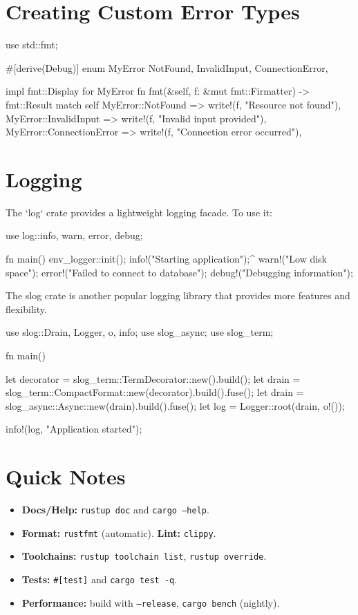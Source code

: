 \documentclass[8pt,a4paper,twocolumn]{extarticle}
\begin{document}
\section{Creating Custom Error Types}

\begin{Code}
use std::fmt;

#[derive(Debug)]
enum MyError {
  NotFound,
  InvalidInput,
  ConnectionError,
}

impl fmt::Display for MyError {
  fn fmt(&self, f: &mut fmt::Firmatter) -> fmt::Result {
    match self {
      MyError::NotFound => write!(f, "Resource not found"),
      MyError::InvalidInput => write!(f, "Invalid input provided"),
      MyError::ConnectionError => write!(f, "Connection error occurred"),
    }
  }
}
\end{Code}


\section{Logging}

The `log` crate provides a lightweight logging facade. To use it:

\begin{Code}
use log::{info, warn, error, debug};

fn main() {
    env_logger::init();
    info!("Starting application");^
    warn!("Low disk space");
    error!("Failed to connect to database");
    debug!("Debugging information");
}
\end{Code}

The slog crate is another popular logging library that provides more features and flexibility.

\begin{Code}
use slog::{Drain, Logger, o, info};
use slog_async;
use slog_term;

fn main() {
    let decorator = slog_term::TermDecorator::new().build();
    let drain = slog_term::CompactFormat::new(decorator).build().fuse();
    let drain = slog_async::Async::new(drain).build().fuse();
    let log = Logger::root(drain, o!());

    info!(log, "Application started");
}
\end{Code}

\section{Quick Notes}
\begin{itemize}
  \item \textbf{Docs/Help:} \texttt{rustup doc} and \texttt{cargo --help}.
  \item \textbf{Format:} \texttt{rustfmt} (automatic). \textbf{Lint:} \texttt{clippy}.
  \item \textbf{Toolchains:} \texttt{rustup toolchain list}, \texttt{rustup override}.
  \item \textbf{Tests:} \texttt{\#[test]} and \texttt{cargo test -q}.
  \item \textbf{Performance:} build with \texttt{--release}, \texttt{cargo bench} (nightly).
\end{itemize}
\end{document}
